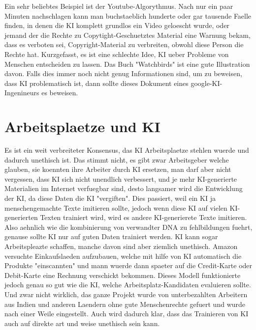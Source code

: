 \documentclass{report}
\begin{document}
\newline 
Ein sehr beliebtes Beispiel ist der Youtube-Algorythmus. Nach nur ein paar Minuten nachschlagen kann man buchstaeblich hunderte oder gar tausende Faelle finden, in denen die KI komplett grundlos ein Video geloescht wurde, oder jemand der die Rechte zu Copytight-Geschuetztes Material eine Warnung bekam, dass es verboten sei, Copyright-Material zu verbreiten, obwohl diese Person die Rechte hat.
\newline
Kurzgefasst, es ist eine schlechte Idee, KI ueber Probleme von Menschen entscheiden zu lassen. Das Buch "Watchbirds" ist eine gute Illustration davon. Falls dies immer noch nicht genug Informationen sind, um zu beweisen, dass KI problematisch ist, dann sollte dieses
Dokument \citep{google-enginner-says-big-ai-sucks}
eines google-KI-Ingenineurs es beweisen.
\section{Arbeitsplaetze und KI}
Es ist ein weit verbreiteter Konsensus, das KI Arbeitsplaetze stehlen wuerde und dadurch unethisch ist. Das stimmt nicht, es gibt zwar Arbeitsgeber welche glauben, sie koennten ihre Arbeiter durch KI ersetzen, man darf aber nicht vergessen, dass KI sich nicht unendlich verbessert, und je mehr KI-generierte Materialien im Internet verfuegbar sind, desto langsamer wird die Entwicklung der KI, da diese Daten die KI "vergiften". Dies passiert, weil ein KI ja menschengemachte Texte imitieren sollte, jedoch wenn diese KI auf vielen KI-generierten Texten trainiert wird, wird es andere KI-generierete Texte imitieren. Also aehnlich wie die kombinierung von verwandter DNA zu fehlbildungen fuehrt, genause sollte KI nur auf guten Daten trainiert werden.
\newline
\newline
KI kann sogar Arbeitspleazte schaffen, manche davon sind aber ziemlich unethisch. Amazon versuchte Einkaufslaeden aufzubauen, welche mit hilfe von KI automatisch die Produkte "einscannten" und mann wuerde dann spaeter auf die Credit-Karte oder Debit-Karte eine Rechnung verschickt bekommen.
\newline
Dieses Modell funktionierte jedoch genau so gut wie die KI, welche Arbeitsplatz-Kandidaten evaluieren sollte. Und zwar nicht wirklich, das ganze Projekt wurde von unterbezahlten Arbeitern aus Indien und anderen Laendern ohne gute Menschenrechte gefuert und wurde nach einer Weile eingestellt. Auch wird dadurch klar, dass das Trainieren von KI auch auf direkte art und weise unethisch sein kann.
\end{document}
